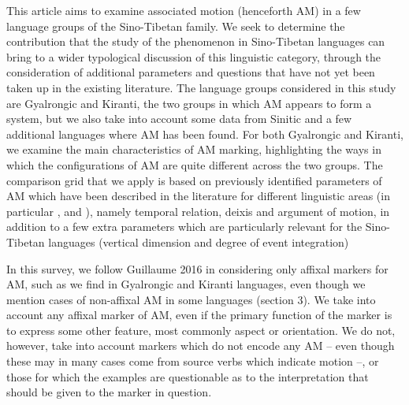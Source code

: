 \documentclass[oneside,a4paper,11pt]{article}
\begin{document}
This article aims to examine associated motion (henceforth AM) in a few language groups of the Sino-Tibetan family.  We seek to determine the contribution that the study of the phenomenon in Sino-Tibetan languages can bring to a wider typological discussion of this linguistic category, through the consideration of additional parameters and questions that have not yet been taken up in the existing literature.  
The language groups considered in this study are Gyalrongic and Kiranti, the two groups in which AM appears to form a system, but we also take into account some data from Sinitic and a few additional languages where AM has been found.  For both Gyalrongic and Kiranti, we examine the main characteristics of AM marking, highlighting the ways in which the configurations of AM are quite different across the two groups.  The comparison grid that we apply is based on previously identified parameters of AM which have been described in the literature for different linguistic areas (in particular \citealt{koch84associated.motion}, \citealt{wilkins91associated.motion} and \citealt{guillaume16am}), namely temporal relation, deixis and argument of motion, in addition to a few extra parameters which are particularly relevant for the Sino-Tibetan languages (vertical dimension and degree of event integration)

%
%
In this survey, we follow Guillaume 2016 in considering only affixal markers for AM, such as we find in Gyalrongic and Kiranti languages, even though we mention cases of non-affixal AM in some languages (section 3).  We take into account any affixal marker of AM, even if the primary function of the marker is to express some other feature, most commonly aspect or orientation.  We do not, however, take into account markers which do not encode any AM -- even though these may in many cases come from source verbs which indicate motion --, or those for which the examples are questionable as to the interpretation that should be given to the marker in question. 
\end{document}
